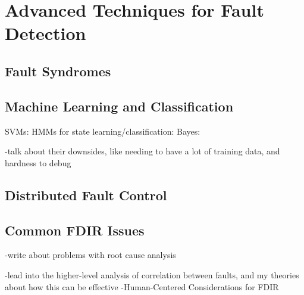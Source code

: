 \section{Advanced Techniques for Fault Detection}

\subsection{Fault Syndromes}

\cite{hammett1991application}


\subsection{Machine Learning and Classification}

SVMs: \cite{lin2006fault}
HMMs for state learning/classification: \cite{aycard2000state}
Bayes: \cite{holsti2001towards} \cite{paakko2001bayesian}

-talk about their downsides, like needing to have a lot of training data, and hardness to debug

\subsection{Distributed Fault Control}

\cite{castel2006fdir}


\subsection{Common FDIR Issues}

\cite{kurien2010intrinsic}

-write about problems with root cause analysis

-lead into the higher-level analysis of correlation between faults, and my theories about how this can be effective
-Human-Centered Considerations for FDIR